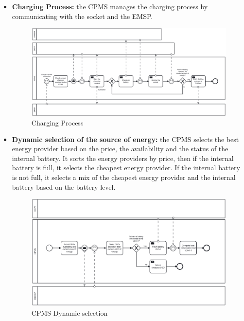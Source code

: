 \documentclass[table, 12pt]{article} %
\begin{document}
        \begin{itemize}                                 
            \item \textbf{Charging Process:} the CPMS manages the charging process by communicating with the socket and the EMSP.
        
            \begin{center}
                \begin{figure}[!h]
                    \includegraphics[width=\textwidth]{assets/bpmn/CPMS_Charging_Process.png}
                    \caption{Charging Process}
                    \label{fig: CPMS Charging Process}
                \end{figure}
            \end{center}
        \end{itemize}
    \newpage
        \begin{itemize}                                 
            \item \textbf{Dynamic selection of the source of energy:} the CPMS selects the best energy provider based on the price, the availability and the status of the internal battery.
            It sorts the energy providers by price, then if the internal battery is full, it selects the cheapest energy provider. If the internal battery is not full, it selects a mix of the cheapest energy provider and the internal battery based on the battery level. 
        
            \begin{center}
                \begin{figure}[!h]
                    \includegraphics[width=\textwidth]{assets/bpmn/CPMS_Dynamic_selection.png}
                    \caption{CPMS Dynamic selection}
                    \label{fig: CPMS Dynamic selection}
                \end{figure}
            \end{center}
        \end{itemize}
\end{document}
